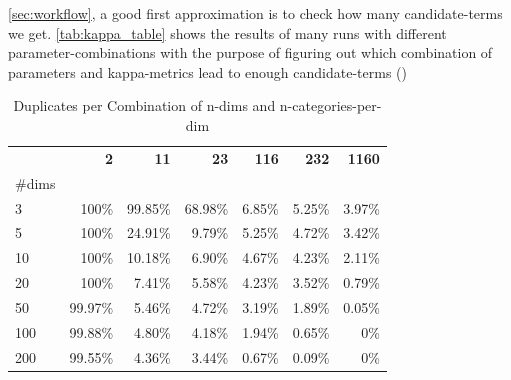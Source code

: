  \autoref{sec:workflow}, a good first approximation is to check how many candidate-terms we get. \autoref{tab:kappa_table} shows the results of many runs with different parameter-combinations with the purpose of figuring out which combination of parameters and kappa-metrics lead to enough candidate-terms ()




\begin{table}
	\caption{Duplicates per Combination of n-dims and n-categories-per-dim}
	\begin{tabular}{lrrrrrr}
	\toprule
	 & \textbf{2} & \textbf{11} & \textbf{23} & \textbf{116} & \textbf{232} & \textbf{1160} \\
	\#dims &  &  &  &  &  &  \\
	\midrule
	3 & 100\% & 99.85\% & 68.98\% & 6.85\% & 5.25\% & 3.97\% \\
	5 & 100\% & 24.91\% & 9.79\% & 5.25\% & 4.72\% & 3.42\% \\
	10 & 100\% & 10.18\% & 6.90\% & 4.67\% & 4.23\% & 2.11\% \\
	20 & 100\% & 7.41\% & 5.58\% & 4.23\% & 3.52\% & 0.79\% \\
	50 & 99.97\% & 5.46\% & 4.72\% & 3.19\% & 1.89\% & 0.05\% \\
	100 & 99.88\% & 4.80\% & 4.18\% & 1.94\% & 0.65\% & 0\% \\
	200 & 99.55\% & 4.36\% & 3.44\% & 0.67\% & 0.09\% & 0\% \\
	\bottomrule
	\end{tabular}
\end{table}



